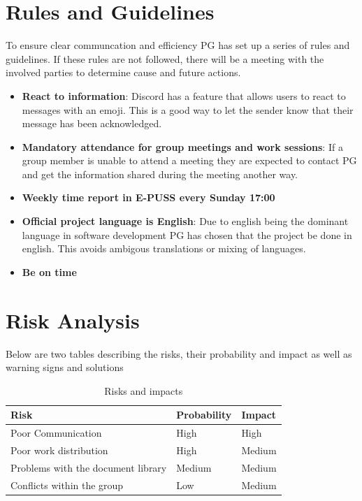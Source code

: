 \documentclass{article}
\begin{document}
\section{Rules and Guidelines} %
    To ensure clear communcation and efficiency PG has set up a series of rules and guidelines. If these rules are not followed, there will be a meeting with the involved parties to determine cause and future actions. 
    
    \begin{itemize}
        \item \textbf{React to information}: Discord has a feature that allows users to react to messages with an emoji. This is a good way to let the sender know that their message has been acknowledged.
        \item \textbf{Mandatory attendance for group meetings and work sessions}: If a group member is unable to attend a meeting they are expected to contact PG and get the information shared during the meeting another way.
        \item \textbf{Weekly time report in E-PUSS every Sunday 17:00}
        \item \textbf{Official project language is English}: Due to english being the dominant language in software development PG has chosen that the project be done in english. This avoids ambigous translations or mixing of languages.
        \item \textbf{Be on time}
    \end{itemize}

\section{Risk Analysis}
    Below are two tables describing the risks, their probability and impact as well as warning signs and solutions
    
    \begin{table}[h]
        \centering
        \begin{tabular}{|l|l|l|}
             \hline
             \textbf{Risk} 
             & \textbf{Probability}
             & \textbf{Impact} \\
             \hline
             Poor Communication 
             & High
             & High \\
             \hline
             Poor work distribution
             & High
             & Medium \\
             \hline
             Problems with the document library
             & Medium
             & Medium \\
             \hline
             Conflicts within the group
             & Low
             & Medium \\
             \hline
        \end{tabular}
        \caption{Risks and impacts}
        \label{tab:my_label}
    \end{table}
\end{document}
